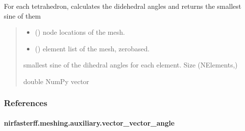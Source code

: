 \documentclass[letterpaper,10pt,english]{sphinxmanual}
\begin{document}
\begin{fulllineitems}
\label{\detokenize{_autosummary/nirfasterff.meshing.auxiliary.simpqual:nirfasterff.meshing.auxiliary.simpqual}}
\pysigstartsignatures
\pysiglinewithargsret
{}
{\sphinxparamcomma {}}
{}
\pysigstopsignatures
\sphinxAtStartPar
For each tetrahedron, calculates the didehedral angles and returns the smallest sine of them
\begin{quote}\begin{description}
\begin{itemize}
\item {} 
\sphinxAtStartPar
{} () \textendash{} node locations of the mesh.

\item {} 
\sphinxAtStartPar
{} () \textendash{} element list of the mesh, zero\sphinxhyphen{}based.

\end{itemize}

\sphinxAtStartPar
smallest sine of the dihedral angles for each element. Size (NElements,)

\sphinxAtStartPar
double NumPy vector

\end{description}\end{quote}
\subsubsection*{References}

\sphinxAtStartPar
{}

\end{fulllineitems}


\sphinxstepscope


\paragraph{nirfasterff.meshing.auxiliary.vector\_vector\_angle}
\label{\detokenize{_autosummary/nirfasterff.meshing.auxiliary.vector_vector_angle:nirfasterff-meshing-auxiliary-vector-vector-angle}}\label{\detokenize{_autosummary/nirfasterff.meshing.auxiliary.vector_vector_angle::doc}}
\end{document}
